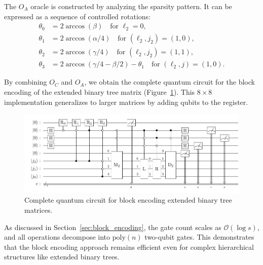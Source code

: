 \documentclass{article}
\begin{document}
    The $O_A$ oracle is constructed by analyzing the sparsity pattern. It can be expressed as a sequence of controlled rotations:
    $$
    \begin{aligned}
        \theta_0 &= 2\arccos(\beta) \quad \text{for } \ell_2 = 0, \\
        \theta_1 &= 2\arccos(\alpha/4) \quad \text{for } (\ell_2, j_2) = (1,0), \\
        \theta_2 &= 2\arccos(\gamma/4) \quad \text{for } (\ell_2, j_2) = (1,1), \\
        \theta_3 &= 2\arccos(\gamma/4 - \beta/2) - \theta_1 \quad \text{for } (\ell_2, j) = (1,0).
    \end{aligned}
    $$

    By combining $O_C$ and $O_A$, we obtain the complete quantum circuit for the block encoding of the extended binary tree matrix (Figure~\ref{fig:tree_circuit}). This $8 \times 8$ implementation generalizes to larger matrices by adding qubits to the register.

    \begin{figure}[htbp]
        \centering
        \includegraphics{pdf/tree_circuit}
        \caption{Complete quantum circuit for block encoding extended binary tree matrices.}
        \label{fig:tree_circuit}
    \end{figure}

    As discussed in Section~\ref{sec:block_encoding}, the gate count scales as $\mathcal{O}(\log s)$, and all operations decompose into $\mathrm{poly}(n)$ two-qubit gates. This demonstrates that the block encoding approach remains efficient even for complex hierarchical structures like extended binary trees.
\end{document}
